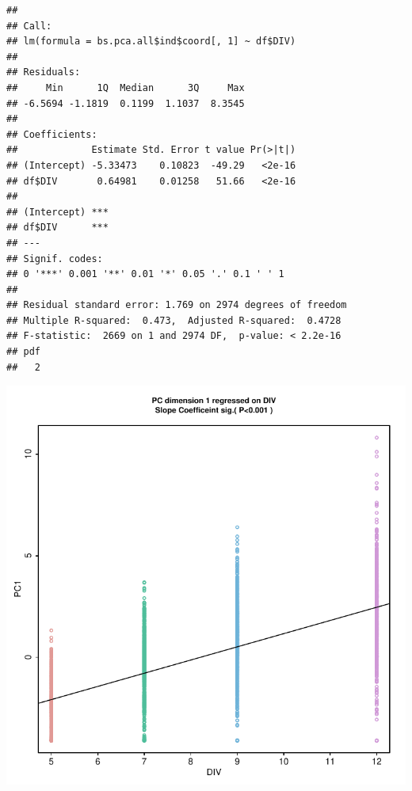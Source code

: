 \documentclass{article}\usepackage[]{graphicx}\usepackage[]{color}
\makeatletter
\def\maxwidth{ %
  \ifdim\Gin@nat@width>\linewidth
    \linewidth
  \else
    \Gin@nat@width
  \fi
}
\newenvironment{kframe}{%
 \def\at@end@of@kframe{}%
 \ifinner\ifhmode%
  \def\at@end@of@kframe{\end{minipage}}%
  \begin{minipage}{\columnwidth}%
 \fi\fi%
 \def\FrameCommand##1{\hskip\@totalleftmargin \hskip-\fboxsep
 \colorbox{shadecolor}{##1}\hskip-\fboxsep
     \hskip-\linewidth \hskip-\@totalleftmargin \hskip\columnwidth}%
 \MakeFramed {\advance\hsize-\width
   \@totalleftmargin\z@ \linewidth\hsize
   \@setminipage}}%
 {\par\unskip\endMakeFramed%
 \at@end@of@kframe}
\newenvironment{knitrout}{}{} %
\makeatother
\begin{document}
\begin{knitrout}
\color{fgcolor}\begin{kframe}
\begin{verbatim}
## 
## Call:
## lm(formula = bs.pca.all$ind$coord[, 1] ~ df$DIV)
## 
## Residuals:
##     Min      1Q  Median      3Q     Max 
## -6.5694 -1.1819  0.1199  1.1037  8.3545 
## 
## Coefficients:
##             Estimate Std. Error t value Pr(>|t|)
## (Intercept) -5.33473    0.10823  -49.29   <2e-16
## df$DIV       0.64981    0.01258   51.66   <2e-16
##                
## (Intercept) ***
## df$DIV      ***
## ---
## Signif. codes:  
## 0 '***' 0.001 '**' 0.01 '*' 0.05 '.' 0.1 ' ' 1
## 
## Residual standard error: 1.769 on 2974 degrees of freedom
## Multiple R-squared:  0.473,	Adjusted R-squared:  0.4728 
## F-statistic:  2669 on 1 and 2974 DF,  p-value: < 2.2e-16
## pdf 
##   2
\end{verbatim}
\end{kframe}

{\centering \includegraphics[width=\maxwidth]{figure/graphics-pca-ANOVA-1} 

}



\end{knitrout}
\end{document}
